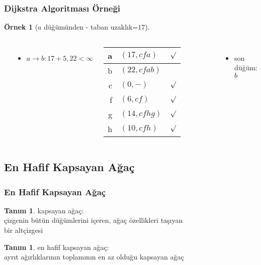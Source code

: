\documentclass[dvipsnames]{beamer}
\theoremstyle{definition}
\newtheorem{tanim}[theorem]{Tanım}
\theoremstyle{example}
\newtheorem{ornek}[theorem]{Örnek}
\theoremstyle{plain}
\begin{document}
\begin{frame}
  \frametitle{Dijkstra Algoritması Örneği}

  \begin{ornek}[$a$ düğümünden - taban uzaklık=$17$]
    \begin{columns}
      \begin{center}
      \end{center}

      \begin{itemize}
        \item $a \rightarrow b: 17+5, 22 < \infty$
      \end{itemize}

      \pause
      \begin{table}
        \begin{tabular}{r|l|c}
          a & $(17,cfa)$   & $\surd$ \\\hline
          b & $(22,cfab)$  & \\\hline
          c & $(0,-)$      & $\surd$ \\\hline
          f & $(6,cf)$     & $\surd$ \\\hline
          g & $(14,cfhg)$  & $\surd$ \\\hline
          h & $(10,cfh)$   & $\surd$
        \end{tabular}
      \end{table}

      \pause
      \begin{itemize}
        \item son düğüm: $b$
      \end{itemize}
    \end{columns}
  \end{ornek}
\end{frame}

\subsection{En Hafif Kapsayan Ağaç}

\begin{frame}
  \frametitle{En Hafif Kapsayan Ağaç}

  \begin{tanim}
    \alert{kapsayan ağaç}:\\
    çizgenin bütün düğümlerini içeren, ağaç özellikleri taşıyan\\
    bir altçizgesi
  \end{tanim}

  \pause
  \begin{tanim}
    \alert{en hafif kapsayan ağaç}:\\
    ayrıt ağırlıklarının toplamının en az olduğu kapsayan ağaç
  \end{tanim}
\end{frame}
\end{document}
